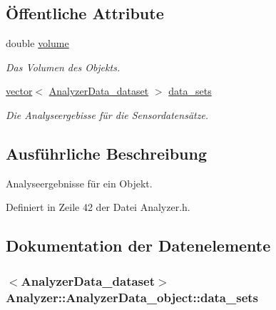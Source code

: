 \subsection*{Öffentliche Attribute}
\begin{DoxyCompactItemize}
\item 
double \hyperlink{structAnalyzer_1_1AnalyzerData__object_a78ddeb311ff702e110fc1d483d826920}{volume}
\begin{DoxyCompactList}\small\item\em Das Volumen des Objekts. \end{DoxyCompactList}\item 
\hyperlink{classstd_1_1vector}{vector}$<$ \hyperlink{structAnalyzer_1_1AnalyzerData__dataset}{Analyzer\-Data\-\_\-dataset} $>$ \hyperlink{structAnalyzer_1_1AnalyzerData__object_a5d36dcf805f37b0e29134236e3881fca}{data\-\_\-sets}
\begin{DoxyCompactList}\small\item\em Die Analyseergebisse für die Sensordatensätze. \end{DoxyCompactList}\end{DoxyCompactItemize}


\subsection{Ausführliche Beschreibung}
Analyseergebnisse für ein Objekt. 

Definiert in Zeile 42 der Datei Analyzer.\-h.



\subsection{Dokumentation der Datenelemente}
\hypertarget{structAnalyzer_1_1AnalyzerData__object_a5d36dcf805f37b0e29134236e3881fca}{
\subsubsection[{data\-\_\-sets}]{$<${\bf Analyzer\-Data\-\_\-dataset}$>$ Analyzer\-::\-Analyzer\-Data\-\_\-object\-::data\-\_\-sets}}\label{structAnalyzer_1_1AnalyzerData__object_a5d36dcf805f37b0e29134236e3881fca}


